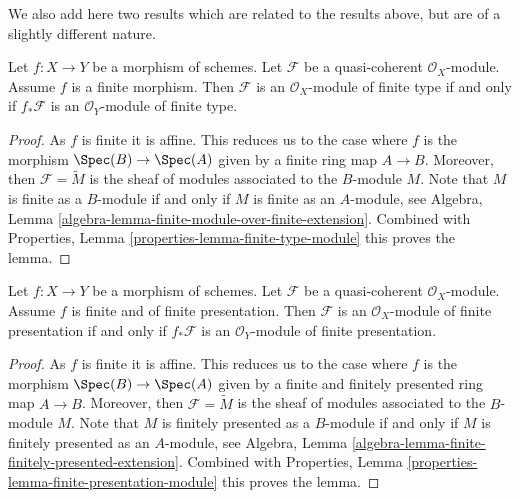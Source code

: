 \noindent
We also add here two results which are related to the results above, but
are of a slightly different nature.

\begin{lemma}
\label{lemma-finite-over-finite-module}
Let $f : X \to Y$ be a morphism of schemes.
Let $\mathcal{F}$ be a quasi-coherent $\mathcal{O}_X$-module.
Assume $f$ is a finite morphism.
Then $\mathcal{F}$ is an $\mathcal{O}_X$-module of finite type
if and only if $f_*\mathcal{F}$ is an $\mathcal{O}_Y$-module of finite
type.
\end{lemma}

\begin{proof}
As $f$ is finite it is affine. This reduces us to the case where
$f$ is the morphism $\Spec(B) \to \Spec(A)$ given
by a finite ring map $A \to B$.
Moreover, then $\mathcal{F} = \widetilde{M}$ is the sheaf of modules
associated to the $B$-module $M$.
Note that $M$ is finite as a $B$-module if and only if
$M$ is finite as an $A$-module, see
Algebra, Lemma \ref{algebra-lemma-finite-module-over-finite-extension}.
Combined with
Properties, Lemma \ref{properties-lemma-finite-type-module}
this proves the lemma.
\end{proof}

\begin{lemma}
\label{lemma-finite-finitely-presented-module}
Let $f : X \to Y$ be a morphism of schemes.
Let $\mathcal{F}$ be a quasi-coherent $\mathcal{O}_X$-module.
Assume $f$ is finite and of finite presentation.
Then $\mathcal{F}$ is an $\mathcal{O}_X$-module of finite presentation
if and only if $f_*\mathcal{F}$ is an $\mathcal{O}_Y$-module of finite
presentation.
\end{lemma}

\begin{proof}
As $f$ is finite it is affine. This reduces us to the case where
$f$ is the morphism $\Spec(B) \to \Spec(A)$ given
by a finite and finitely presented ring map $A \to B$.
Moreover, then $\mathcal{F} = \widetilde{M}$ is the sheaf of modules
associated to the $B$-module $M$.
Note that $M$ is finitely presented as a $B$-module if and only if
$M$ is finitely presented as an $A$-module, see
Algebra, Lemma \ref{algebra-lemma-finite-finitely-presented-extension}.
Combined with
Properties, Lemma \ref{properties-lemma-finite-presentation-module}
this proves the lemma.
\end{proof}
















